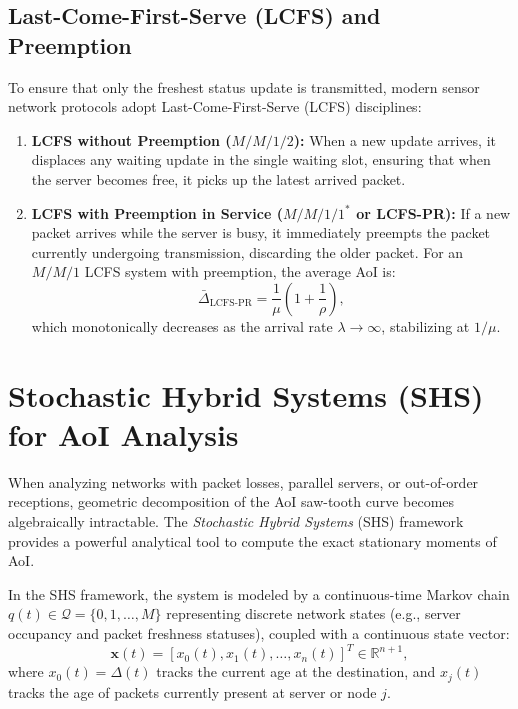 \subsection{Last-Come-First-Serve (LCFS) and Preemption}
To ensure that only the freshest status update is transmitted, modern sensor network protocols adopt Last-Come-First-Serve (LCFS) disciplines:
\begin{enumerate}
    \item \textbf{LCFS without Preemption ($M/M/1/2$):} When a new update arrives, it displaces any waiting update in the single waiting slot, ensuring that when the server becomes free, it picks up the latest arrived packet.
    \item \textbf{LCFS with Preemption in Service ($M/M/1/1^*$ or LCFS-PR):} If a new packet arrives while the server is busy, it immediately preempts the packet currently undergoing transmission, discarding the older packet. For an $M/M/1$ LCFS system with preemption, the average AoI is:
    \begin{equation}
        \bar{\Delta}_{\text{LCFS-PR}} = \frac{1}{\mu} \left( 1 + \frac{1}{\rho} \right),
    \end{equation}
    which monotonically decreases as the arrival rate $\lambda \to \infty$, stabilizing at $1/\mu$.
\end{enumerate}

\section{Stochastic Hybrid Systems (SHS) for AoI Analysis}
\label{sec:shs_framework}

When analyzing networks with packet losses, parallel servers, or out-of-order receptions, geometric decomposition of the AoI saw-tooth curve becomes algebraically intractable. The \emph{Stochastic Hybrid Systems} (SHS) framework provides a powerful analytical tool to compute the exact stationary moments of AoI.

In the SHS framework, the system is modeled by a continuous-time Markov chain $q(t) \in \mathcal{Q} = \{0, 1, \dots, M\}$ representing discrete network states (e.g., server occupancy and packet freshness statuses), coupled with a continuous state vector:
\begin{equation}
    \mathbf{x}(t) = [x_0(t), x_1(t), \dots, x_n(t)]^T \in \mathbb{R}^{n+1},
\end{equation}
where $x_0(t) = \Delta(t)$ tracks the current age at the destination, and $x_j(t)$ tracks the age of packets currently present at server or node $j$.

